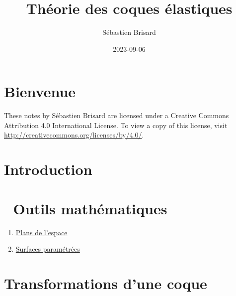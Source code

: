 \documentclass[
  a4paper,
  DIV=11,
  numbers=noendperiod]{scrreprt}
\title{Théorie des coques élastiques}
\author{Sébastien Brisard}
\date{2023-09-06}
\providecommand{\tightlist}{%
  \setlength{\itemsep}{0pt}\setlength{\parskip}{0pt}}\usepackage{longtable,booktabs,array}
\renewcommand*\contentsname{Table des matières}
\newcommand\contentsname{Table des matières}
\begin{document}
\maketitle
\ifdefined\Shaded\renewenvironment{Shaded}{\begin{tcolorbox}[breakable, enhanced, frame hidden, borderline west={3pt}{0pt}{shadecolor}, interior hidden, boxrule=0pt, sharp corners]}{\end{tcolorbox}}\fi

\renewcommand*\contentsname{Table des matières}
{
\hypersetup{linkcolor=}
\setcounter{tocdepth}{2}
\tableofcontents
}

\hypertarget{bienvenue}{%
\chapter{Bienvenue}\label{bienvenue}}

These notes by Sébastien Brisard are licensed under a Creative Commons
Attribution 4.0 International License. To view a copy of this license,
visit \url{http://creativecommons.org/licenses/by/4.0/}.


\hypertarget{introduction}{%
\chapter{Introduction}\label{introduction}}


\hypertarget{outils-mathuxe9matiques}{%
\chapter{🔧 Outils mathématiques}\label{outils-mathuxe9matiques}}

\begin{enumerate}
\def\labelenumi{\arabic{enumi}.}
\tightlist
\item
  \href{@sec-20230214053442}{Plans de l'espace}
\item
  \href{@sec-20230906085507}{Surfaces paramétrées}
\end{enumerate}


\hypertarget{transformations-dune-coque}{%
\chapter{Transformations d'une coque}\label{transformations-dune-coque}}
\end{document}
